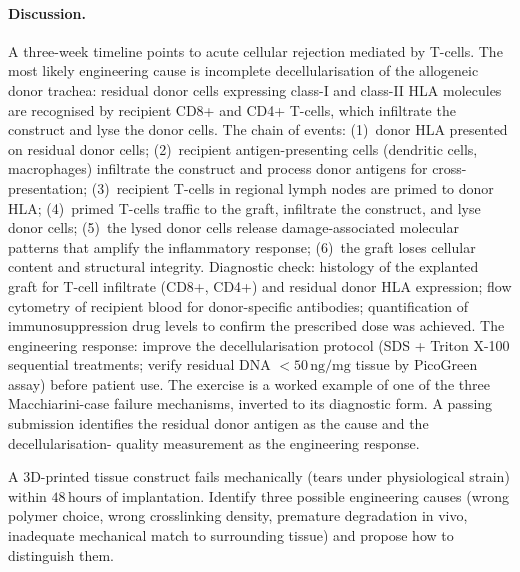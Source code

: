 \paragraph{Discussion.} A three-week timeline points to acute
cellular rejection mediated by T-cells. The most likely engineering
cause is incomplete decellularisation of the allogeneic donor
trachea: residual donor cells expressing class-I and class-II HLA
molecules are recognised by recipient CD8+ and CD4+ T-cells, which
infiltrate the construct and lyse the donor cells. The chain of
events: (1)~donor HLA presented on residual donor cells; (2)~recipient
antigen-presenting cells (dendritic cells, macrophages) infiltrate
the construct and process donor antigens for cross-presentation;
(3)~recipient T-cells in regional lymph nodes are primed to donor
HLA; (4)~primed T-cells traffic to the graft, infiltrate the
construct, and lyse donor cells; (5)~the lysed donor cells release
damage-associated molecular patterns that amplify the inflammatory
response; (6)~the graft loses cellular content and structural
integrity. Diagnostic check: histology of the explanted graft for
T-cell infiltrate (CD8+, CD4+) and residual donor HLA expression;
flow cytometry of recipient blood for donor-specific antibodies;
quantification of immunosuppression drug levels to confirm the
prescribed dose was achieved. The engineering response: improve the
decellularisation protocol (SDS + Triton X-100 sequential
treatments; verify residual DNA $< 50\,\text{ng/mg}$ tissue by
PicoGreen assay) before patient use. The exercise is a worked
example of one of the three Macchiarini-case failure mechanisms,
inverted to its diagnostic form. A passing submission identifies
the residual donor antigen as the cause and the decellularisation-
quality measurement as the engineering response.

\begin{exercise}
A 3D-printed tissue construct fails mechanically (tears under
physiological strain) within $48\,\text{hours}$ of implantation.
Identify three possible engineering causes (wrong polymer choice,
wrong crosslinking density, premature degradation in vivo, inadequate
mechanical match to surrounding tissue) and propose how to
distinguish them.
\end{exercise}

